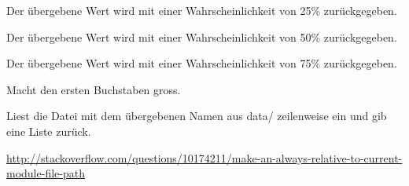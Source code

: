 \documentclass[a4paper,12pt,oneside]{sphinxmanual}
\begin{document}

\begin{fulllineitems}
\label{module:pyzufall.helfer.e25}
Der übergebene Wert wird mit einer Wahrscheinlichkeit von 25\% zurückgegeben.

\end{fulllineitems}


\begin{fulllineitems}
\label{module:pyzufall.helfer.e50}
Der übergebene Wert wird mit einer Wahrscheinlichkeit von 50\% zurückgegeben.

\end{fulllineitems}


\begin{fulllineitems}
\label{module:pyzufall.helfer.e75}
Der übergebene Wert wird mit einer Wahrscheinlichkeit von 75\% zurückgegeben.

\end{fulllineitems}


\begin{fulllineitems}
\label{module:pyzufall.helfer.erste_gross}
Macht den ersten Buchstaben gross.

\end{fulllineitems}


\begin{fulllineitems}
\label{module:pyzufall.helfer.lese}
Liest die Datei mit dem übergebenen Namen aus data/ zeilenweise ein und gib eine Liste zurück.

\href{http://stackoverflow.com/questions/10174211/make-an-always-relative-to-current-module-file-path}{http://stackoverflow.com/questions/10174211/make-an-always-relative-to-current-module-file-path}

\end{fulllineitems}
\end{document}
